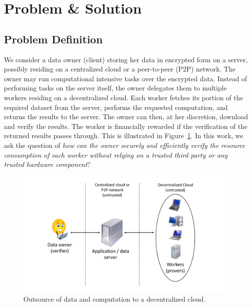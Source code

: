 \section{Problem \& Solution} \label{sect:overview}

\subsection{Problem Definition} \label{sect:problem}

We consider a data owner (client) storing her data in encrypted form on a server, possibly residing on a centralized cloud or a peer-to-peer (P2P) network.
The owner may run computational intensive tasks over the encrypted data.
Instead of performing tasks on the server itself, the owner delegates them to multiple workers residing on a decentralized cloud. 
Each worker fetches its portion of the required dataset from the server, performs the requested computation, and returns the results to the server.
The owner can then, at her discretion, download and verify the results.
The worker is financially rewarded if the verification of the returned results passes through.
This is illustrated in Figure~\ref{fig:model}.
In this work, we ask the question of {\em how can the owner securely and efficiently verify the resource consumption of each worker without relying on a trusted third party or any trusted hardware component}?

\begin{figure}[h!]\centering
  \includegraphics[scale=0.30]{model.pdf}
  \caption{Outsource of data and computation to a decentralized cloud.}
  \label{fig:model}
\end{figure}

